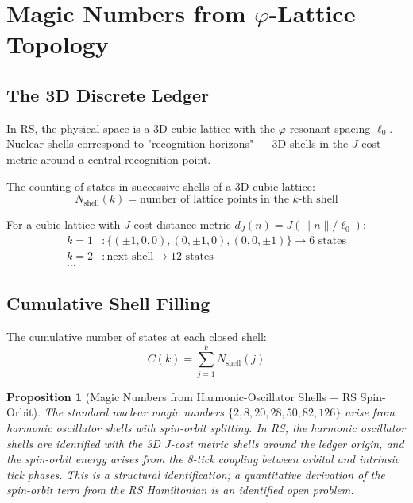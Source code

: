 \documentclass[12pt,a4paper]{article}
\newtheorem{proposition}[theorem]{Proposition}
\theoremstyle{definition}
\theoremstyle{remark}
\begin{document}
\section{Magic Numbers from $\varphi$-Lattice Topology}

\subsection{The 3D Discrete Ledger}

In RS, the physical space is a 3D cubic lattice with the $\varphi$-resonant spacing 
$\ell_0$. Nuclear shells correspond to "recognition horizons" — 3D shells in the 
$J$-cost metric around a central recognition point.

The counting of states in successive shells of a 3D cubic lattice:
\begin{equation}
N_\mathrm{shell}(k) = \text{number of lattice points in the $k$-th shell}
\end{equation}

For a cubic lattice with $J$-cost distance metric $d_J(n) = J(\|n\|/\ell_0)$:
\begin{align}
k=1&: \{(\pm 1, 0, 0), (0, \pm 1, 0), (0, 0, \pm 1)\} \to 6 \text{ states}\\
k=2&: \text{next shell} \to 12 \text{ states}\\
\ldots
\end{align}

\subsection{Cumulative Shell Filling}

The cumulative number of states at each closed shell:
\begin{equation}
C(k) = \sum_{j=1}^{k} N_\mathrm{shell}(j)
\end{equation}

\begin{proposition}[Magic Numbers from Harmonic-Oscillator Shells + RS Spin-Orbit]\label{thm:magic}
The standard nuclear magic numbers $\{2, 8, 20, 28, 50, 82, 126\}$ arise from harmonic
oscillator shells with spin-orbit splitting.  In RS, the harmonic oscillator shells are
identified with the 3D $J$-cost metric shells around the ledger origin, and the spin-orbit
energy arises from the 8-tick coupling between orbital and intrinsic tick phases.
This is a structural identification; a quantitative derivation of the spin-orbit term from
the RS Hamiltonian is an identified open problem.
\end{proposition}
\end{document}
